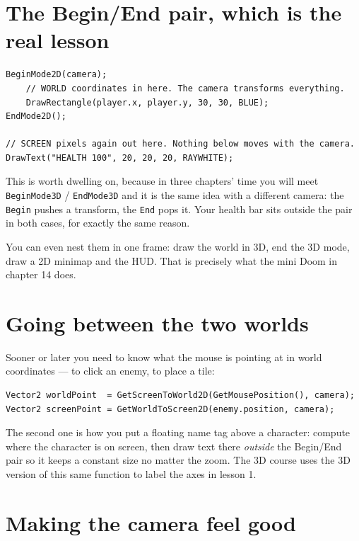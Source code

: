 \section{The Begin/End pair, which is the real lesson}

\begin{lstlisting}
BeginMode2D(camera);
    // WORLD coordinates in here. The camera transforms everything.
    DrawRectangle(player.x, player.y, 30, 30, BLUE);
EndMode2D();

// SCREEN pixels again out here. Nothing below moves with the camera.
DrawText("HEALTH 100", 20, 20, 20, RAYWHITE);
\end{lstlisting}


This is worth dwelling on, because in three chapters' time you will meet
\lstinline|BeginMode3D| / \lstinline|EndMode3D| and it is the same idea with a
different camera: the \lstinline|Begin| pushes a transform, the \lstinline|End|
pops it. Your health bar sits outside the pair in both cases, for exactly the
same reason.

You can even nest them in one frame: draw the world in 3D, end the 3D mode, draw
a 2D minimap and the HUD. That is precisely what the mini Doom in chapter 14
does.

\section{Going between the two worlds}

Sooner or later you need to know what the mouse is pointing at in world
coordinates --- to click an enemy, to place a tile:

\begin{lstlisting}
Vector2 worldPoint  = GetScreenToWorld2D(GetMousePosition(), camera);
Vector2 screenPoint = GetWorldToScreen2D(enemy.position, camera);
\end{lstlisting}

The second one is how you put a floating name tag above a character: compute
where the character is on screen, then draw text there \emph{outside} the
Begin/End pair so it keeps a constant size no matter the zoom. The 3D course
uses the 3D version of this same function to label the axes in lesson 1.

\section{Making the camera feel good}

